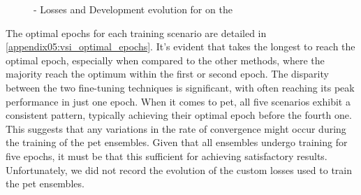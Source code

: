 \begin{figure}[ht]
    \centering
    \hfill
    \hfill
    \caption{\petThousand{} - Losses and Development \fTwo{} evolution for \bertroberta{} on the \trafilaturaTitle{}}
    \label{fig:07_vsi_sample_training_logs_pet_1000}
\end{figure}



The optimal epochs for each training scenario are detailed in \appendixname{} \ref{appendix05:vsi_optimal_epochs}. It's evident that \unbalanced{} takes the longest to reach the optimal epoch, especially when compared to the other methods, where the majority reach the optimum within the first or second epoch. The disparity between the two fine-tuning techniques is significant, with \balanced{} often reaching its peak performance in just one epoch. When it comes to \gls{pet}, all five scenarios exhibit a consistent pattern, typically achieving their optimal epoch before the fourth one. This suggests that any variations in the rate of convergence might occur during the training of the \gls{pet} ensembles. Given that all ensembles undergo training for five epochs, it must be that this sufficient for achieving satisfactory results. Unfortunately, we did not record the evolution of the custom losses used to train the \gls{pet} ensembles.


